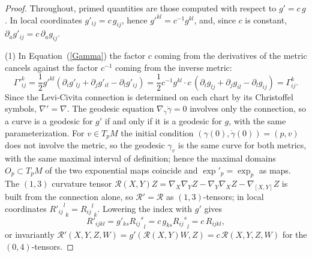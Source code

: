\begin{proof}
Throughout, primed quantities are those computed with respect to
$g'=c\,g$. In local coordinates $g'_{ij}=c\,g_{ij}$, hence
$g'^{kl}=c^{-1}g^{kl}$, and, since $c$ is constant,
$\partial_a g'_{ij}=c\,\partial_a g_{ij}$.

(1) In Equation~(\ref{Gamma}) the factor $c$ coming from the
derivatives of the metric cancels against the factor $c^{-1}$
coming from the inverse metric:
$$\Gamma'^{k}_{ij}
=\frac{1}{2}g'^{kl}(\partial_i g'_{lj}+\partial_j g'_{il}
-\partial_l g'_{ij})
=\frac{1}{2}c^{-1}g^{kl}\cdot c\,(\partial_i g_{lj}
+\partial_j g_{il}-\partial_l g_{ij})
=\Gamma^{k}_{ij}.$$
Since the Levi-Civita connection is determined on each chart by its
Christoffel symbols, $\nabla'=\nabla$. The geodesic equation
$\nabla_{\dot\gamma}\dot\gamma=0$ involves only the connection, so
a curve is a geodesic for $g'$ if and only if it is a geodesic for
$g$, with the same parameterization. For $v\in T_pM$ the initial
condition $(\gamma(0),\dot\gamma(0))=(p,v)$ does not involve the
metric, so the geodesic $\gamma_v$ is the same curve for both
metrics, with the same maximal interval of definition; hence the
maximal domains $O_p\subset T_pM$ of the two exponential maps
coincide and $\exp'_p=\exp_p$ as maps. The $(1,3)$ curvature
tensor ${\mathcal R}(X,Y)Z=\nabla_X\nabla_YZ-\nabla_Y\nabla_XZ
-\nabla_{[X,Y]}Z$ is built from the connection alone, so
${\mathcal R}'={\mathcal R}$ as $(1,3)$-tensors; in local
coordinates ${{R'_{ij}}^l}_k={{R_{ij}}^l}_k$. Lowering the index
with $g'$ gives
$$R'_{ijkl}=g'_{ks}{{R_{ij}}^s}_l=c\,g_{ks}{{R_{ij}}^s}_l
=c\,R_{ijkl},$$
or invariantly ${\mathcal R}'(X,Y,Z,W)=g'({\mathcal R}(X,Y)W,Z)
=c\,{\mathcal R}(X,Y,Z,W)$ for the $(0,4)$-tensors.


\end{proof}
